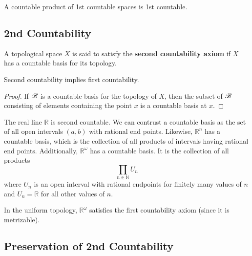   \begin{theorem}
    
  \end{theorem}

  \begin{theorem}
    A countable product of 1st countable spaces is 1st countable. 
  \end{theorem}

\subsection{2nd Countability}

  \begin{definition}[2nd-Countability]
    A topological space $X$ is said to satisfy the \textbf{second countability axiom} if $X$ has a countable basis for its topology.
  \end{definition}

  \begin{theorem}
    Second countability implies first countability. 
  \end{theorem}
  \begin{proof}
    If $\operatorname{\mathscr{B}}$ is a countable basis for the topology of $X$, then the subset of $\operatorname{\mathscr{B}}$ consisting of elements containing the point $x$ is a countable basis at $x$. 
  \end{proof}

  \begin{example}
    The real line $\mathbb{R}$ is second countable. We can contrust a countable basis as the set of all open intervals $(a, b)$ with rational end points. Likewise, $\mathbb{R}^n$ has a countable basis, which is the collection of all products of intervals having rational end points. Additionally, $\mathbb{R}^\omega$ has a countable basis. It is the collection of all products
    \begin{equation}
      \prod_{n \in \mathbb{N}} U_n
    \end{equation}
    where $U_n$ is an open interval with rational endpoints for finitely many values of $n$ and $U_n = \mathbb{R}$ for all other values of $n$. 
  \end{example}

  \begin{example}
    In the uniform topology, $\mathbb{R}^\omega$ satisfies the first countability axiom (since it is metrizable). 
  \end{example}

\subsection{Preservation of 2nd Countability}

